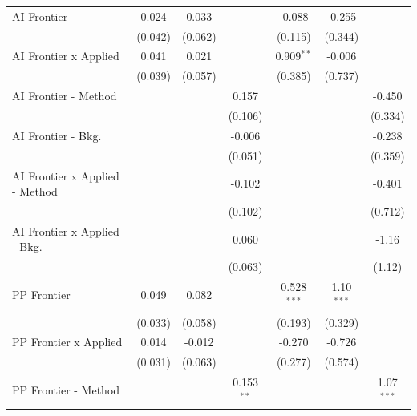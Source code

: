 \begin{tabular}{lcccccc}
   AI Frontier                    & 0.024         & 0.033     &              & -0.088        & -0.255       &   \\   
                                  & (0.042)       & (0.062)   &              & (0.115)       & (0.344)      &   \\   
   AI Frontier x Applied          & 0.041         & 0.021     &              & 0.909$^{**}$  & -0.006       &   \\   
                                  & (0.039)       & (0.057)   &              & (0.385)       & (0.737)      &   \\   
   AI Frontier - Method           &               &           & 0.157        &               &              & -0.450\\   
                                  &               &           & (0.106)      &               &              & (0.334)\\   
   AI Frontier - Bkg.             &               &           & -0.006       &               &              & -0.238\\   
                                  &               &           & (0.051)      &               &              & (0.359)\\   
   AI Frontier x Applied - Method &               &           & -0.102       &               &              & -0.401\\   
                                  &               &           & (0.102)      &               &              & (0.712)\\   
   AI Frontier x Applied - Bkg.   &               &           & 0.060        &               &              & -1.16\\   
                                  &               &           & (0.063)      &               &              & (1.12)\\   
   PP Frontier                    & 0.049         & 0.082     &              & 0.528$^{***}$ & 1.10$^{***}$ &   \\   
                                  & (0.033)       & (0.058)   &              & (0.193)       & (0.329)      &   \\   
   PP Frontier x Applied          & 0.014         & -0.012    &              & -0.270        & -0.726       &   \\   
                                  & (0.031)       & (0.063)   &              & (0.277)       & (0.574)      &   \\   
   PP Frontier - Method           &               &           & 0.153$^{**}$ &               &              & 1.07$^{***}$\\   

\end{tabular}
